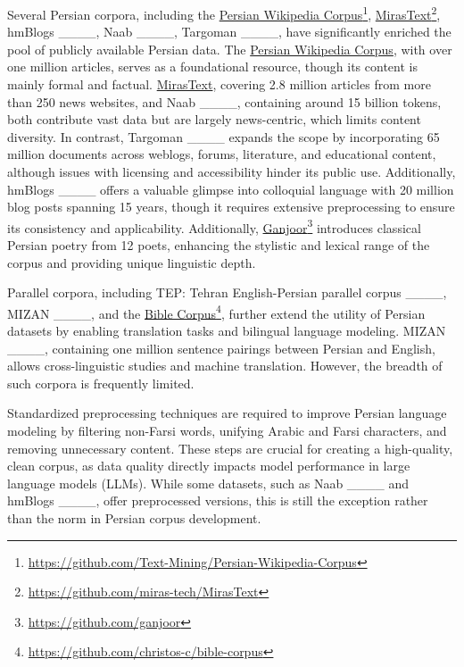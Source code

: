 Several Persian corpora, including the \href{https://github.com/Text-Mining/Persian-Wikipedia-Corpus}{Persian Wikipedia Corpus}\footnote{\href{https://github.com/Text-Mining/Persian-Wikipedia-Corpus}{https://github.com/Text-Mining/Persian-Wikipedia-Corpus}}, \href{https://github.com/miras-tech/MirasText}{MirasText}\footnote{\href{https://github.com/miras-tech/MirasText}{https://github.com/miras-tech/MirasText}}, hmBlogs ____, Naab ____, Targoman ____, have significantly enriched the pool of publicly available Persian data. The \href{https://github.com/Text-Mining/Persian-Wikipedia-Corpus}{Persian Wikipedia Corpus}, with over one million articles, serves as a foundational resource, though its content is mainly formal and factual. \href{https://github.com/miras-tech/MirasText}{MirasText}, covering 2.8 million articles from more than 250 news websites, and Naab ____, containing around 15 billion tokens, both contribute vast data but are largely news-centric, which limits content diversity. In contrast, Targoman ____ expands the scope by incorporating 65 million documents across weblogs, forums, literature, and educational content, although issues with licensing and accessibility hinder its public use. Additionally, hmBlogs ____ offers a valuable glimpse into colloquial language with 20 million blog posts spanning 15 years, though it requires extensive preprocessing to ensure its consistency and applicability. Additionally, \href{https://github.com/ganjoor}{Ganjoor}\footnote{\href{https://github.com/ganjoor}{https://github.com/ganjoor}} introduces classical Persian poetry from 12 poets, enhancing the stylistic and lexical range of the corpus and providing unique linguistic depth.

Parallel corpora, including TEP: Tehran English-Persian parallel corpus ____, MIZAN ____, and the \href{https://github.com/christos-c/bible-corpus}{Bible Corpus}\footnote{\href{https://github.com/christos-c/bible-corpus}{https://github.com/christos-c/bible-corpus}}, further extend the utility of Persian datasets by enabling translation tasks and bilingual language modeling. MIZAN ____, containing one million sentence pairings between Persian and English, allows cross-linguistic studies and machine translation. However, the breadth of such corpora is frequently limited.

Standardized preprocessing techniques are required to improve Persian language modeling by filtering non-Farsi words, unifying Arabic and Farsi characters, and removing unnecessary content. These steps are crucial for creating a high-quality, clean corpus, as data quality directly impacts model performance in large language models (LLMs). While some datasets, such as Naab ____ and hmBlogs ____, offer preprocessed versions, this is still the exception rather than the norm in Persian corpus development.

